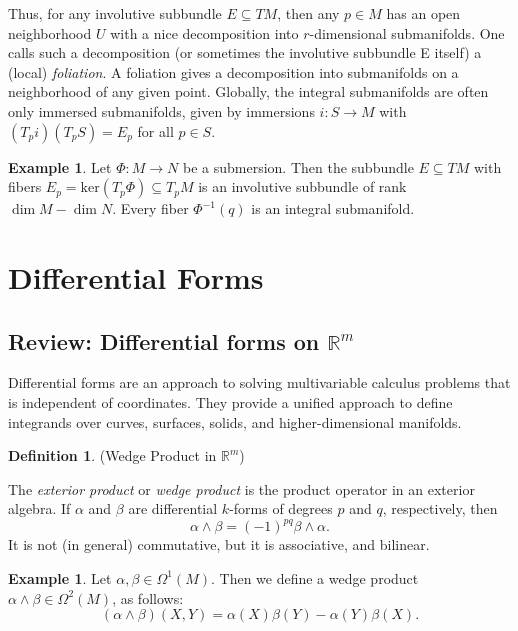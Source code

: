 \documentclass{article}
\theoremstyle{definition}
\newtheorem{defn}[theorem]{Definition}
\newtheorem{example}[theorem]{Example}
\newenvironment{definition}
  {\vspace{8pt}\begin{mdframed}[backgroundcolor=blueish]\begin{defn}}
  {\end{defn}\end{mdframed}\vspace{4pt}}
\begin{document}
Thus, for any involutive subbundle $E \subseteq TM$, then any $p \in M$ has an open neighborhood $U$ with a nice decomposition into $r$-dimensional submanifolds. One calls such a decomposition (or sometimes the involutive subbundle E itself) a (local) \textit{foliation}. A foliation gives a decomposition into submanifolds on a neighborhood of any given point. Globally, the integral submanifolds are often only immersed submanifolds, given by immersions $i : S \rightarrow M$ with $(T_pi)(T_pS) = E_p$ for
all $p \in S$.

\begin{example}
Let $\Phi : M \rightarrow N$ be a submersion. Then the subbundle $E \subseteq TM$ with fibers $E_p = \text{ker}(T_p \Phi) \subseteq T_pM$ is an involutive subbundle of rank $\dim M - \dim N$. Every fiber $\Phi^{-1}(q)$ is an integral submanifold.
\end{example}


\newpage
\section{Differential Forms}



\subsection{Review: Differential forms on \texorpdfstring{$\mathbb R^m$}{Rm}}

Differential forms are an approach to solving multivariable calculus problems that is independent of coordinates. They provide a unified approach to define integrands over curves, surfaces, solids, and higher-dimensional manifolds.

\begin{definition} (Wedge Product in $\mathbb R^m$)

The \textit{exterior product} or \textit{wedge product} is the product operator in an exterior algebra. If $\alpha$ and $\beta$ are differential $k$-forms of degrees $p$ and $q$, respectively, then
\[
    \alpha \wedge \beta=(-1)^{pq} \beta \wedge \alpha. 	
\]
It is not (in general) commutative, but it is associative, and bilinear. 

\end{definition}
\begin{example}
Let $\alpha, \beta \in \Omega^1(M)$. Then we define a wedge product $\alpha \wedge \beta \in \Omega^2 (M)$, as follows:
\[
    (\alpha \wedge \beta)(X,Y) = \alpha (X)\beta(Y)-\alpha(Y)\beta(X).
\]
\end{example}
\end{document}
